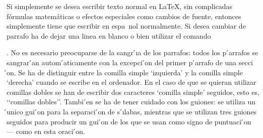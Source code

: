 \documentclass[a4paper,10pt]{letter}
\begin{document}
Si simplemente se desea escribir texto normal en LaTeX,
sin complicadas fórmulas matemáticas o efectos especiales
como cambios de fuente, entonces simplemente tiene que escribir
en espa~nol normalmente.
Si desea cambiar de parrafo ha de dejar una linea en blanco o bien
utilizar el comando \par.
No es necesario preocuparse de la sangr ́ıa de los parrafos:
todos los p ́arrafos se sangrar ́an autom ́aticamente con la excepci ́on
del primer p ́arrafo de una secci ́on.
Se ha de distinguir entre la comilla simple ‘izquierda’
y la comilla simple ‘derecha’ cuando se escribe en el ordenador.
En el caso de que se quieran utilizar comillas dobles se han de
escribir dos caracteres ‘comilla simple’ seguidos, esto es,
‘‘comillas dobles’’.
Tambi ́en se ha de tener cuidado con los guiones: se utiliza un ́unico
gui ́on para la separaci ́on de s ́ılabas, mientras que se utilizan
tres guiones seguidos para producir un gui ́on de los que se usan
como signo de puntuaci ́on --- como en esta oraci ́on.
\end{document}
